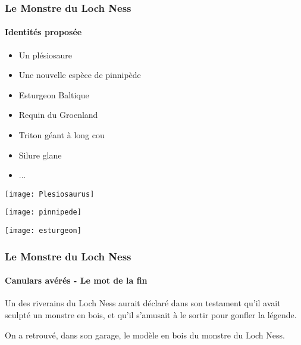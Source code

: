 \documentclass[11pt]{beamer}
\begin{document}
\begin{frame}
	\frametitle{Le Monstre du Loch Ness}
	\framesubtitle{Identités proposée}
	\begin{itemize}
		\item Un plésiosaure
		\item Une nouvelle espèce de pinnipède
		\item Esturgeon Baltique
		\item Requin du Groenland
		\item Triton géant à long cou
		\item Silure glane
		\item ...
	\end{itemize}
\begin{minipage}[c]{0.31\linewidth}
	\begin{center}
		\texttt{[image: Plesiosaurus]} %
		\\
	\end{center}
\end{minipage}
\begin{minipage}[c]{0.33\linewidth}
	\begin{center}
		\texttt{[image: pinnipede]}\vspace{0.2cm}
	\end{center}
\end{minipage}
\begin{minipage}[c]{0.32\linewidth}
	\begin{center}
		\texttt{[image: esturgeon]} %
	\end{center}
\end{minipage}
\end{frame}
\begin{frame}
\frametitle{Le Monstre du Loch Ness}
\framesubtitle{Canulars avérés - Le mot de la fin}
Un des riverains du Loch Ness aurait déclaré dans son testament qu'il avait sculpté un monstre en bois, et qu'il s'amusait à le sortir pour gonfler la légende.

\pause  On a retrouvé, dans son garage, le modèle en bois du monstre du Loch Ness.
\end{frame}
\end{document}
